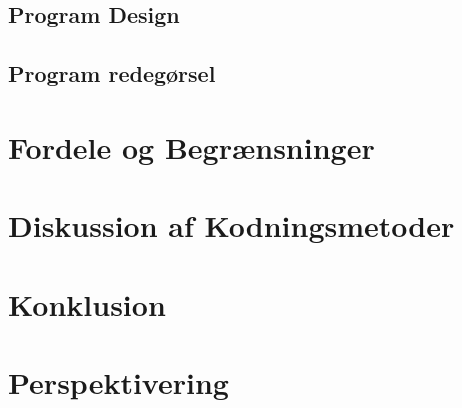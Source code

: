 

\subsection{Program Design}

\subsection{Program redegørsel}

\section{Fordele og Begrænsninger}

\section{Diskussion af Kodningsmetoder}

\section{Konklusion}

\section{Perspektivering}
